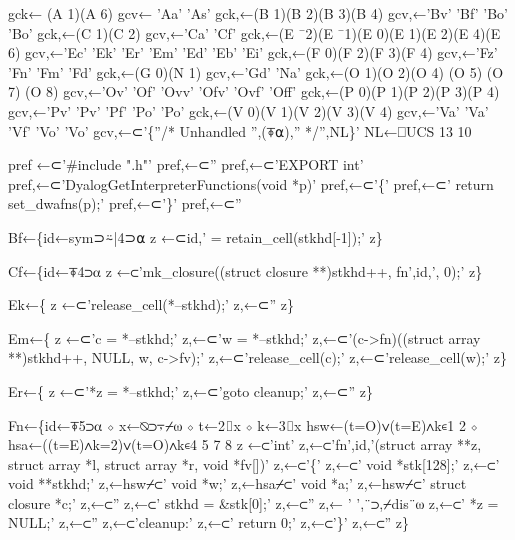 \documentclass{article}%
\begin{document}
        gck← (A 1)(A 6)
        gcv← 'Aa' 'As'
        gck,←(B 1)(B 2)(B 3)(B 4)
        gcv,←'Bv' 'Bf' 'Bo' 'Bo'
        gck,←(C 1)(C 2)
        gcv,←'Ca' 'Cf'
        gck,←(E ¯2)(E ¯1)(E 0)(E 1)(E 2)(E 4)(E 6)
        gcv,←'Ec'      'Ek'    'Er' 'Em' 'Ed' 'Eb' 'Ei'
        gck,←(F 0)(F 2)(F 3)(F 4)
        gcv,←'Fz' 'Fn' 'Fm' 'Fd'
        gck,←(G 0)(N 1)
        gcv,←'Gd' 'Na'
        gck,←(O 1)(O 2)(O 4) (O 5) (O 7) (O 8)
        gcv,←'Ov' 'Of' 'Ovv' 'Ofv' 'Ovf' 'Off'
        gck,←(P 0)(P 1)(P 2)(P 3)(P 4)
        gcv,←'Pv' 'Pv' 'Pf' 'Po' 'Po'
        gck,←(V 0)(V 1)(V 2)(V 3)(V 4)
        gcv,←'Va' 'Va' 'Vf' 'Vo' 'Vo'
        gcv,←⊂'\{''/* Unhandled '',(⍕⍺),'' */'',NL\}'
        NL←⎕UCS 13 10

        pref ←⊂'#include ".h"'
        pref,←⊂''
        pref,←⊂'EXPORT int'
        pref,←⊂'DyalogGetInterpreterFunctions(void *p)'
        pref,←⊂'\{'
        pref,←⊂'    return set_dwafns(p);'
        pref,←⊂'\}'
        pref,←⊂''

        Bf←\{id←sym⊃⍨|4⊃⍺
                z ←⊂id,' = retain_cell(stkhd[-1]);'
        z\}

        Cf←\{id←⍕4⊃⍺
                z ←⊂'mk_closure((struct closure **)stkhd++, fn',id,', 0);'
        z\}

        Ek←\{
                z ←⊂'release_cell(*--stkhd);'
                z,←⊂''
        z\}

        Em←\{
                z ←⊂'c = *--stkhd;'
                z,←⊂'w = *--stkhd;'
                z,←⊂'(c->fn)((struct array **)stkhd++, NULL, w, c->fv);'
                z,←⊂'release_cell(c);'
                z,←⊂'release_cell(w);'
        z\}

        Er←\{
                z ←⊂'*z = *--stkhd;'
                z,←⊂'goto cleanup;'
                z,←⊂''
        z\}

        Fn←\{id←⍕5⊃⍺ ⋄ x←⍉⊃⍪⌿⍵ ⋄ t←2⌷x ⋄ k←3⌷x
                hsw←(t=O)∨(t=E)∧k∊1 2 ⋄ hsa←((t=E)∧k=2)∨(t=O)∧k∊4 5 7 8
                z ←⊂'int'
                z,←⊂'fn',id,'(struct array **z, struct array *l, struct array *r, void *fv[])'
                z,←⊂'\{'
                z,←⊂'       void    *stk[128];'
                z,←⊂'       void    **stkhd;'
                z,←hsw⌿⊂' void    *w;'
                z,←hsa⌿⊂' void    *a;'
                z,←hsw⌿⊂' struct  closure *c;'
                z,←⊂''
                z,←⊂'       stkhd = &stk[0];'
                z,←⊂''
                z,← ' ',¨⊃,⌿dis¨⍵
                z,←⊂'       *z = NULL;'
                z,←⊂''
                z,←⊂'cleanup:'
                z,←⊂'       return 0;'
                z,←⊂'\}'
                z,←⊂''
        z\}
\end{document}
